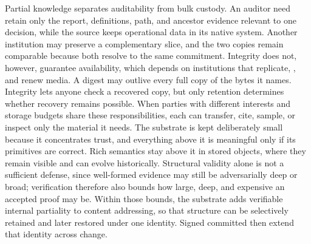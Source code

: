Partial knowledge separates auditability from bulk custody. An auditor need retain only the report, definitions, path, and ancestor evidence relevant to one decision, while the source keeps operational data in its native system. Another institution may preserve a complementary slice, and the two copies remain comparable because both resolve to the same commitment. Integrity does not, however, guarantee availability, which depends on institutions that replicate, , and renew media. A digest may outlive every full copy of the bytes it names. Integrity lets anyone check a recovered copy, but only retention determines whether recovery remains possible. When parties with different interests and storage budgets share these responsibilities, each can transfer, cite, sample, or inspect only the material it needs. The substrate is kept deliberately small because it concentrates trust, and everything above it is meaningful only if its primitives are correct. Rich semantics stay above it in stored objects, where they remain visible and can evolve historically. Structural validity alone is not a sufficient defense, since well-formed evidence may still be adversarially deep or broad; verification therefore also bounds how large, deep, and expensive an accepted proof may be. Within those bounds, the substrate adds verifiable internal partiality to content addressing, so that structure can be selectively retained and later restored under one identity. Signed committed  then extend that identity across change.
